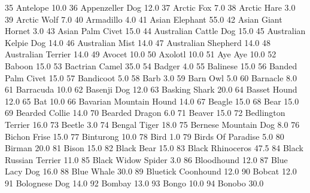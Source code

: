 \documentclass[a4paper]{article}
\begin{document}
\begin{Schunk}
\begin{Soutput}
35                        Antelope     10.0
36                 Appenzeller Dog     12.0
37                      Arctic Fox      7.0
38                     Arctic Hare      3.0
39                     Arctic Wolf      7.0
40                       Armadillo      4.0
41                  Asian Elephant     55.0
42              Asian Giant Hornet      3.0
43                Asian Palm Civet     15.0
44           Australian Cattle Dog     15.0
45           Australian Kelpie Dog     14.0
46                 Australian Mist     14.0
47             Australian Shepherd     14.0
48              Australian Terrier     14.0
49                          Avocet     10.0
50                         Axolotl     10.0
51                        Aye Aye      10.0
52                          Baboon     15.0
53                  Bactrian Camel     35.0
54                          Badger      4.0
55                        Balinese     15.0
56               Banded Palm Civet     15.0
57                       Bandicoot      5.0
58                            Barb      3.0
59                        Barn Owl      5.0
60                        Barnacle      8.0
61                       Barracuda     10.0
62                     Basenji Dog     12.0
63                   Basking Shark     20.0
64                    Basset Hound     12.0
65                             Bat     10.0
66         Bavarian Mountain Hound     14.0
67                          Beagle     15.0
68                            Bear     15.0
69                  Bearded Collie     14.0
70                  Bearded Dragon      6.0
71                          Beaver     15.0
72              Bedlington Terrier     16.0
73                          Beetle      3.0
74                    Bengal Tiger     18.0
75            Bernese Mountain Dog      8.0
76                    Bichon Frise     15.0
77                       Binturong     10.0
78                            Bird      1.0
79               Birds Of Paradise      5.0
80                          Birman     20.0
81                           Bison     15.0
82                      Black Bear     15.0
83                Black Rhinoceros     47.5
84           Black Russian Terrier     11.0
85              Black Widow Spider      3.0
86                      Bloodhound     12.0
87                   Blue Lacy Dog     16.0
88                      Blue Whale     30.0
89              Bluetick Coonhound     12.0
90                          Bobcat     12.0
91                   Bolognese Dog     14.0
92                          Bombay     13.0
93                           Bongo     10.0
94                          Bonobo     30.0

\end{Soutput}
\end{Schunk}
\end{document}
